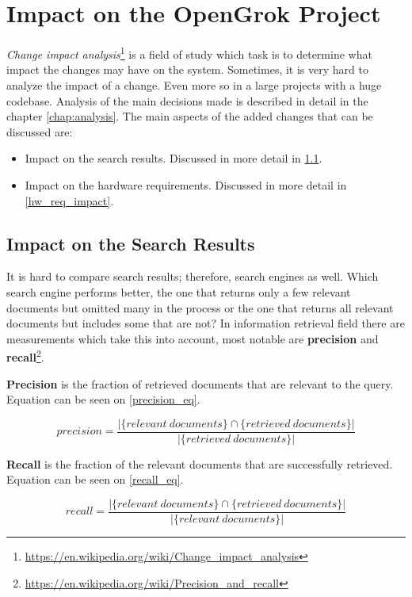 \chapter{Impact on the OpenGrok Project}
\label{chap:impact}

\textit{Change impact analysis}\footnote{\url{https://en.wikipedia.org/wiki/Change\_impact\_analysis}} is a field of
study which task is to determine what impact the changes may have on the system. Sometimes, it is very hard to analyze
the impact of a change. Even more so in a large projects with a huge codebase. Analysis of the main decisions made is
described in detail in the chapter \ref{chap:analysis}. The main aspects of the added changes that can be discussed are:
\begin{itemize}
    \item Impact on the search results. Discussed in more detail in \ref{search_res_impact}.
    \item Impact on the hardware requirements. Discussed in more detail in \ref{hw_req_impact}.
\end{itemize}

\section{Impact on the Search Results}
\label{search_res_impact}
It is hard to compare search results; therefore, search engines as well. Which search engine performs better, the one
that returns only a few relevant documents but omitted many in the process or the one that returns all relevant
documents but includes some that are not?
In information retrieval field there are measurements which take this into account, most notable are \textbf{precision}
and \textbf{recall}\footnote{\url{https://en.wikipedia.org/wiki/Precision\_and\_recall}}.

\textbf{Precision} is the fraction of retrieved documents that are relevant to the query. Equation can be seen on
\ref{precision_eq}.

\begin{equation}
\label{precision_eq}
precision = \frac{\vert \{relevant\ documents\} \cap \{ retrieved\ documents \} \vert}{\vert \{ retrieved\ documents \} \vert}
\end{equation}

\textbf{Recall} is the fraction of the relevant documents that are successfully retrieved. Equation can be seen on
\ref{recall_eq}.

\begin{equation}
\label{recall_eq}
recall = \frac{\vert \{relevant\ documents\} \cap \{ retrieved\ documents \} \vert}{\vert \{ relevant\ documents \} \vert}
\end{equation}

